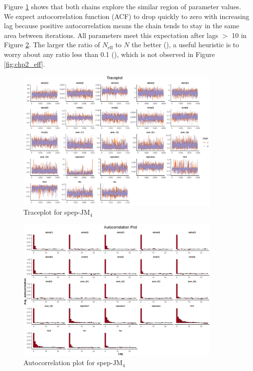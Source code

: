 Figure \ref{fig:chp2_trace} shows that both chains explore the similar region of parameter values. We expect autocorrelation function (ACF) to drop quickly to zero with increasing lag because positive autocorrelation means the chain tends to stay in the same area between iterations. All parameters meet this expectation after lags $>$ 10 in Figure \ref{fig:chp2_acf}. The larger the ratio of $N_{\mbox{eff}}$ to $N$ the better (\cite{Gelman2013b}), a useful heuristic is to worry about any ratio less than 0.1 (\cite{StanManual}), which is not observed in Figure \ref{fig:chp2_eff}. 

\begin{figure}[H]
\centering
\includegraphics[width=0.9\textwidth]{Figures/Chp2_trace.png}
\caption{Traceplot for spep-$\mbox{JM}_4$}
\label{fig:chp2_trace}
\end{figure}

\begin{figure}[H]
\centering
\includegraphics[width=0.9\textwidth]{Figures/Chp2_acf.png}
\caption{Autocorrelation plot for spep-$\mbox{JM}_4$}
\label{fig:chp2_acf}
\end{figure}

